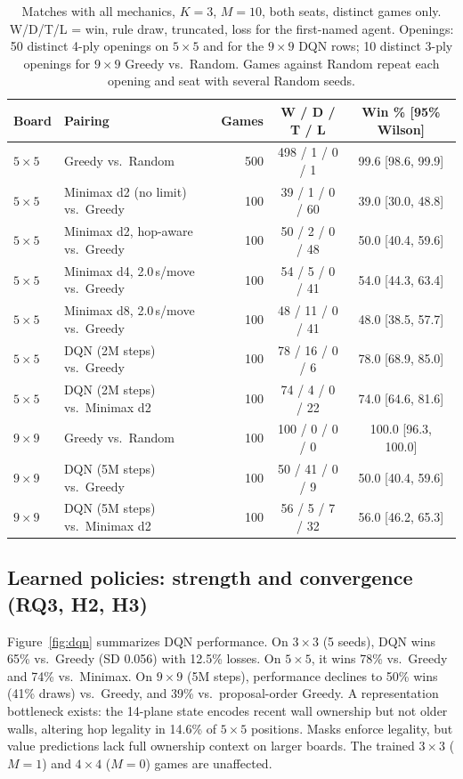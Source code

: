 \documentclass[10pt]{article}
\begin{document}
\begin{table}[!tb]
\centering\small
\caption{Matches with all mechanics, $K=3$, $M=10$, both seats, distinct games only. W/D/T/L = win, rule draw, truncated, loss for the first-named agent. Openings: 50 distinct 4-ply openings on $5\times5$ and for the $9\times9$ DQN rows; 10 distinct 3-ply openings for $9\times9$ Greedy vs.\ Random. Games against Random repeat each opening and seat with several Random seeds.}
\label{tab:matches}
\begin{tabular}{llrcc}
\toprule
Board & Pairing & Games & W / D / T / L & Win \% [95\% Wilson]\\
\midrule
$5\times5$ & Greedy vs.\ Random & 500 & 498 / 1 / 0 / 1 & 99.6 [98.6, 99.9]\\
$5\times5$ & Minimax d2 (no limit) vs.\ Greedy & 100 & 39 / 1 / 0 / 60 & 39.0 [30.0, 48.8]\\
$5\times5$ & Minimax d2, hop-aware vs.\ Greedy & 100 & 50 / 2 / 0 / 48 & 50.0 [40.4, 59.6]\\
$5\times5$ & Minimax d4, 2.0\,s/move vs.\ Greedy & 100 & 54 / 5 / 0 / 41 & 54.0 [44.3, 63.4]\\
$5\times5$ & Minimax d8, 2.0\,s/move vs.\ Greedy & 100 & 48 / 11 / 0 / 41 & 48.0 [38.5, 57.7]\\
$5\times5$ & DQN (2M steps) vs.\ Greedy & 100 & 78 / 16 / 0 / 6 & 78.0 [68.9, 85.0]\\
$5\times5$ & DQN (2M steps) vs.\ Minimax d2 & 100 & 74 / 4 / 0 / 22 & 74.0 [64.6, 81.6]\\
$9\times9$ & Greedy vs.\ Random & 100 & 100 / 0 / 0 / 0 & 100.0 [96.3, 100.0]\\
$9\times9$ & DQN (5M steps) vs.\ Greedy & 100 & 50 / 41 / 0 / 9 & 50.0 [40.4, 59.6]\\
$9\times9$ & DQN (5M steps) vs.\ Minimax d2 & 100 & 56 / 5 / 7 / 32 & 56.0 [46.2, 65.3]\\
\bottomrule
\end{tabular}
\end{table}

\subsection{Learned policies: strength and convergence (RQ3, H2, H3)}
Figure~\ref{fig:dqn} summarizes DQN performance. On $3\times3$ (5 seeds), DQN wins 65\% vs.\ Greedy (SD 0.056) with 12.5\% losses. On $5\times5$, it wins 78\% vs.\ Greedy and 74\% vs.\ Minimax. On $9\times9$ (5M steps), performance declines to 50\% wins (41\% draws) vs.\ Greedy, and 39\% vs.\ proposal-order Greedy. A representation bottleneck exists: the 14-plane state encodes recent wall ownership but not older walls, altering hop legality in 14.6\% of $5\times5$ positions. Masks enforce legality, but value predictions lack full ownership context on larger boards. The trained $3\times3$ ($M=1$) and $4\times4$ ($M=0$) games are unaffected.
\end{document}
